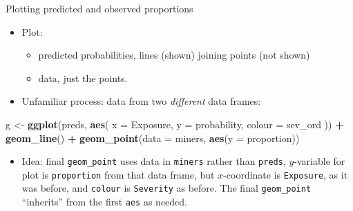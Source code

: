 \documentclass[
  ignorenonframetext,
]{beamer}
\newenvironment{Shaded}{\begin{snugshade}}{\end{snugshade}}
\newcommand{\DataTypeTok}[1]{\textcolor[rgb]{0.13,0.29,0.53}{#1}}
\newcommand{\KeywordTok}[1]{\textcolor[rgb]{0.13,0.29,0.53}{\textbf{#1}}}
\newcommand{\NormalTok}[1]{#1}
\newcommand{\OperatorTok}[1]{\textcolor[rgb]{0.81,0.36,0.00}{\textbf{#1}}}
\newcommand{\StringTok}[1]{\textcolor[rgb]{0.31,0.60,0.02}{#1}}
\providecommand{\tightlist}{%
  \setlength{\itemsep}{0pt}\setlength{\parskip}{0pt}}
\begin{document}
\begin{frame}[fragile]{Plotting predicted and observed proportions}
\protect\hypertarget{plotting-predicted-and-observed-proportions}{}

\begin{itemize}
\tightlist
\item
  Plot:

  \begin{itemize}
  \item
    predicted probabilities, lines (shown) joining points (not shown)
  \item
    data, just the points.
  \end{itemize}
\item
  Unfamiliar process: data from two \emph{different} data frames:
\end{itemize}

\small

\begin{Shaded}
\begin{Highlighting}[]
\NormalTok{g <-}\StringTok{ }\KeywordTok{ggplot}\NormalTok{(preds, }\KeywordTok{aes}\NormalTok{(}
  \DataTypeTok{x =}\NormalTok{ Exposure, }\DataTypeTok{y =}\NormalTok{ probability,}
  \DataTypeTok{colour =}\NormalTok{ sev_ord}
\NormalTok{)) }\OperatorTok{+}\StringTok{ }\KeywordTok{geom_line}\NormalTok{() }\OperatorTok{+}
\StringTok{  }\KeywordTok{geom_point}\NormalTok{(}\DataTypeTok{data =}\NormalTok{ miners, }\KeywordTok{aes}\NormalTok{(}\DataTypeTok{y =}\NormalTok{ proportion))}
\end{Highlighting}
\end{Shaded}

\normalsize

\begin{itemize}
\tightlist
\item
  Idea: final \texttt{geom\_point} uses data in \texttt{miners} rather
  than \texttt{preds}, \(y\)-variable for plot is \texttt{proportion}
  from that data frame, but \(x\)-coordinate is \texttt{Exposure}, as it
  was before, and \texttt{colour} is \texttt{Severity} as before. The
  final \texttt{geom\_point} ``inherits'' from the first \texttt{aes} as
  needed.
\end{itemize}

\end{frame}
\end{document}
